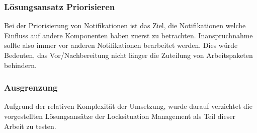 \subsubsection{Lösungsansatz Priorisieren}
Bei der Priorisierung von Notifikationen ist das Ziel,
die Notifikationen welche Einfluss auf andere Komponenten haben zuerst zu betrachten.
Inanspruchnahme sollte also immer vor anderen Notifikationen bearbeitet werden.
Dies würde Bedeuten, das Vor/Nachbereitung nicht länger die Zuteilung von Arbeitspaketen behindern.

\subsubsection{Ausgrenzung}
Aufgrund der relativen Komplexität der Umsetzung,
wurde darauf verzichtet die vorgestellten Lösungsansätze der Locksituation Management
als Teil dieser Arbeit zu testen.